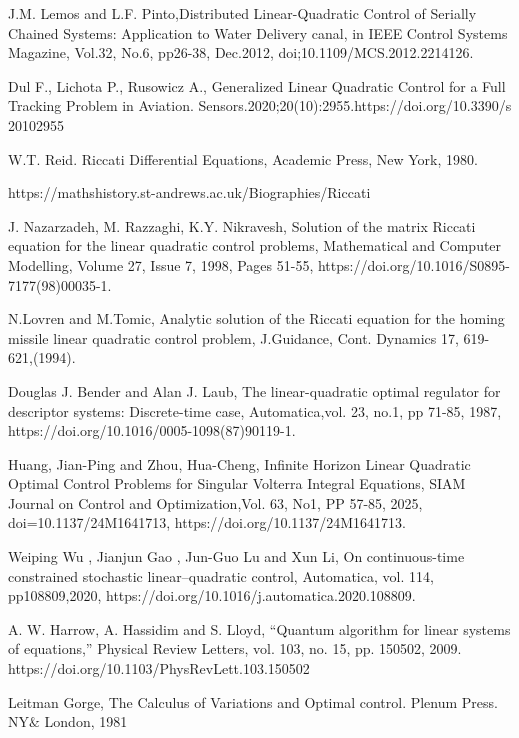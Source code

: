 \documentclass[12pt]{article}
\begin{document}
\begin{thebibliography}{99}
J.M. Lemos and L.F. Pinto,Distributed Linear-Quadratic 
Control of Serially Chained Systems: Application to Water Delivery canal, in IEEE Control Systems Magazine, Vol.32,
No.6, pp26-38, Dec.2012,
doi;10.1109/MCS.2012.2214126.

Dul F., Lichota P., Rusowicz A., Generalized Linear Quadratic Control for a Full Tracking Problem in Aviation. Sensors.2020;20(10):2955.https://doi.org/10.3390/s 20102955

W.T. Reid. Riccati Differential Equations, Academic Press, New York, 1980.

 https://mathshistory.st-andrews.ac.uk/Biographies/Riccati
 

J. Nazarzadeh, M. Razzaghi, K.Y. Nikravesh,
Solution of the matrix Riccati equation for the linear quadratic control problems,
Mathematical and Computer Modelling,
Volume 27, Issue 7,
1998,
Pages 51-55,
https://doi.org/10.1016/S0895-7177(98)00035-1.

N.Lovren and M.Tomic, Analytic solution of the Riccati equation for the homing missile linear quadratic control problem, J.Guidance, Cont. Dynamics 17, 619-621,(1994).

Douglas J. Bender and Alan J. Laub, The linear-quadratic optimal regulator for descriptor systems: Discrete-time case, Automatica,vol. 23, no.1, pp 71-85, 1987, https://doi.org/10.1016/0005-1098(87)90119-1.

Huang, Jian-Ping and Zhou, Hua-Cheng, Infinite Horizon Linear Quadratic Optimal Control Problems for Singular Volterra Integral Equations, SIAM Journal on Control and Optimization,Vol. 63, No1, PP 57-85, 2025, doi=10.1137/24M1641713, https://doi.org/10.1137/24M1641713.

Weiping Wu , Jianjun Gao , Jun-Guo Lu and Xun Li, On continuous-time constrained stochastic linear–quadratic control, Automatica, vol. 114, pp108809,2020,
https://doi.org/10.1016/j.automatica.2020.108809.

A. W. Harrow, A. Hassidim and S. Lloyd, “Quantum algorithm for linear systems of equations,” Physical
Review Letters, vol. 103, no. 15, pp. 150502, 2009. https://doi.org/10.1103/PhysRevLett.103.150502


 Leitman Gorge, The Calculus of Variations and Optimal control. Plenum Press. NY$\&$  London, 1981 
 

\end{thebibliography}
\end{document}
